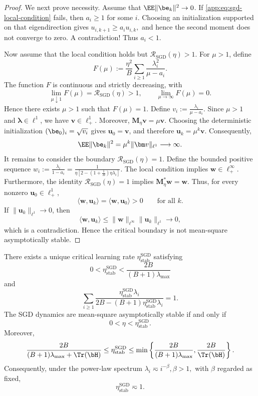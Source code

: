 \begin{proof}
We next prove necessity. Assume that \(\EE\|\be_k\|^2\to0\). If
\eqref{app:eq:sgd-local-condition} fails, then $a_i\geq1$ for some
$i$. Choosing an initialization supported on that eigendirection
gives
\(
u_{i,k+1}
\geq
a_i u_{i,k},
\)
and hence the second moment does not converge to zero. A contradiction! Thus \(a_i<1\).

Now assume that the local condition holds but
\(\mathcal R_{\mathrm{SGD}}(\eta)>1.\)
For $\mu>1$, define
\[
F(\mu)
:=
\frac{\eta^2}{B}
\sum_{i\geq1}
\frac{\lambda_i^2}{\mu-a_i}.
\]
The function $F$ is continuous and strictly decreasing, with
\[
\lim_{\mu\downarrow1}F(\mu)
=
\mathcal R_{\mathrm{SGD}}(\eta)>1,
\qquad
\lim_{\mu\to\infty}F(\mu)=0.
\]
Hence there exists $\mu>1$ such that $F(\mu)=1$. Define
\(
v_i
:=
\frac{\lambda_i}{\mu-a_i}.
\)
Since $\mu>1$ and $\bm\lambda\in\ell^1$, we have
$\bm v\in\ell_+^1$. Moreover,
\(
\bm M_\eta\bm v
=
\mu\bm v.
\)
Choosing the deterministic initialization
\(
(\be_0)_i=\sqrt{v_i}
\)
gives $\bm u_0=\bm v$, and therefore
\(
\bm u_k
=
\mu^k\bm v.
\)
Consequently,
\[
\EE\|\be_k\|^2
=
\mu^k\|\bm v\|_{\ell^1}
\longrightarrow\infty.
\]
It remains to consider the boundary
\(
\mathcal R_{\mathrm{SGD}}(\eta)=1.
\)
Define the bounded positive sequence
\(
w_i
:=
\frac{\lambda_i}{1-a_i}
=
\frac{1}
{\eta\left[
2-(1+\frac1B)\eta\lambda_i
\right]}.
\)
The local condition implies $\bm w\in\ell^\infty_+$. Furthermore,
the identity $\mathcal R_{\mathrm{SGD}}(\eta)=1$ implies
\(
\bm M_\eta^*\bm w
=
\bm w.
\)
Thus, for every nonzero $\bm u_0\in\ell_+^1$,
\[
\langle\bm w,\bm u_k\rangle
=
\langle\bm w,\bm u_0\rangle
>0
\qquad
\text{for all }k.
\]
If $\|\bm u_k\|_{\ell^1}\to0$, then
\[
\langle\bm w,\bm u_k\rangle
\leq
\|\bm w\|_{\ell^\infty}
\|\bm u_k\|_{\ell^1}
\longrightarrow0,
\]
which is a contradiction. Hence the critical boundary is not
mean-square asymptotically stable.

\end{proof}

\begin{corollary}
\label{app:cor:sgd-critical-learning-rate}
There exists a unique critical learning rate
$\eta_{\mathrm{stab}}^{\mathrm{SGD}}$ satisfying
\[
0
<
\eta_{\mathrm{stab}}^{\mathrm{SGD}}
<
\frac{2B}{(B+1)\lambda_{\max}}
\]
and
\begin{equation}
\label{app:eq:sgd-critical-equation}
\sum_{i\geq1}
\frac{
\eta_{\mathrm{stab}}^{\mathrm{SGD}}\lambda_i
}{
2B-(B+1)
\eta_{\mathrm{stab}}^{\mathrm{SGD}}\lambda_i
}
=
1.
\end{equation}
The SGD dynamics are mean-square asymptotically stable if and only if
\[
0<\eta<\eta_{\mathrm{stab}}^{\mathrm{SGD}}.
\]
Moreover,
\begin{equation}
\label{app:eq:sgd-critical-bounds}
\frac{2B}
{(B+1)\lambda_{\max}+\Tr(\bH)}
\leq
\eta_{\mathrm{stab}}^{\mathrm{SGD}}
\leq
\min\left\{
\frac{2B}{(B+1)\lambda_{\max}},
\frac{2B}{\Tr(\bH)}
\right\}.
\end{equation}
Consequently, under the power-law spectrum
\(
\lambda_i\eqsim i^{-\beta},
\beta>1,
\)
with $\beta$ regarded as fixed,
\[
\eta_{\mathrm{stab}}^{\mathrm{SGD}}
\eqsim
1.
\]
\end{corollary}

